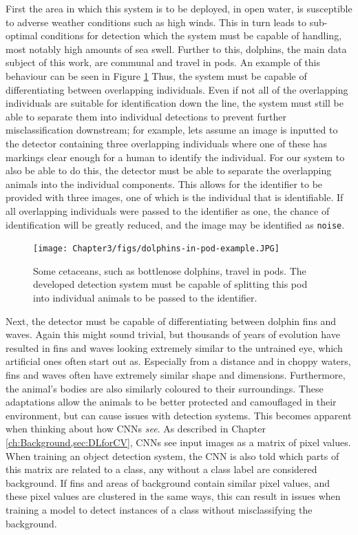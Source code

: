  First the area in which this system is to be deployed, in open water, is susceptible to adverse weather conditions such as high winds. This in turn leads to sub-optimal conditions for detection which the system must be capable of handling, most notably high amounts of sea swell. Further to this, dolphins, the main data subject of this work, are communal and travel in pods. An example of this behaviour can be seen in Figure \ref{fig:pod-eg} Thus, the system must be capable of differentiating between overlapping individuals. Even if not all of the overlapping individuals are suitable for identification down the line, the system must still be able to separate them into individual detections to prevent further misclassification downstream; for example, lets assume an image is inputted to the detector containing three overlapping individuals where one of these has markings clear enough for a human to identify the individual. For our system to also be able to do this, the detector must be able to separate the overlapping animals into the individual components. This allows for the identifier to be provided with three images, one of which is the individual that is identifiable. If all overlapping individuals were passed to the identifier as one, the chance of identification will be greatly reduced, and the image may be identified as \texttt{noise}. 
 
 \begin{figure}
 	\begin{center}
 		\texttt{[image: Chapter3/figs/dolphins-in-pod-example.JPG]}
 	\end{center}
 	\caption{Some cetaceans, such as bottlenose dolphins, travel in pods. The developed detection system must be capable of splitting this pod into individual animals to be passed to the identifier.
 	}
 	\label{fig:pod-eg}
 \end{figure}

 Next, the detector must be capable of differentiating between dolphin fins and waves. Again this might sound trivial, but thousands of years of evolution have resulted in fins and waves looking extremely similar to the untrained eye, which artificial ones often start out as. Especially from a distance and in choppy waters, fins and waves often have extremely similar shape and dimensions. Furthermore, the animal's bodies are also similarly coloured to their surroundings. These adaptations allow the animals to be better protected and camouflaged in their environment, but can cause issues with detection systems. This becomes apparent when thinking about how CNNs \textit{see}. As described in Chapter \ref{ch:Background,sec:DLforCV}, CNNs see input images as a matrix of pixel values. When training an object detection system, the CNN is also told which parts of this matrix are related to a class, any without a class label are considered background. If fins and areas of background contain similar pixel values, and these pixel values are clustered in the same ways, this can result in issues when training a model to detect instances of a class without misclassifying the background. 
 

